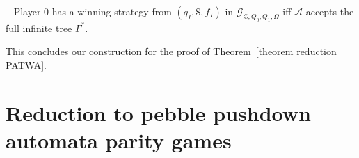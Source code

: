 \documentclass[a4paper,UKenglish,cleveref, autoref, thm-restate]{lipics-v2021}
\newcommand\mh[1]{\todo[inline,size=\scriptsize]{#1 - \textbf{Mathieu}}}
\begin{document}
\begin{lemma}~\label{lemma reduction PATWA}
Player $0$ has a winning strategy from $(q_I, \$, f_I)$ in $\mathcal{G}_{\mathcal{Z},Q_0,Q_1,\Omega}$ iff $\mathcal{A}$ accepts the full
infinite tree $\Gamma^* $.

\end{lemma}


This concludes our construction for the proof of Theorem~\ref{theorem reduction PATWA}.





\section{%
Reduction to pebble pushdown automata parity games
}\label{pebbles}



\end{document}
